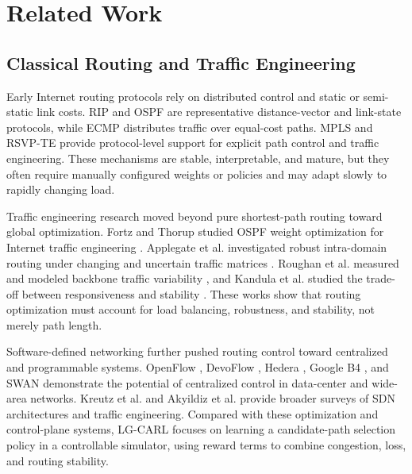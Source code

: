 \documentclass[9pt,a4paper,twocolumn,twoside]{rho-class/rho}
\begin{document}
\section{Related Work}

\subsection{Classical Routing and Traffic Engineering}

Early Internet routing protocols rely on distributed control and static or semi-static link costs. RIP \cite{hedrick1988rip} and OSPF \cite{moy1998ospf} are representative distance-vector and link-state protocols, while ECMP \cite{hopps2000ecmp} distributes traffic over equal-cost paths. MPLS \cite{rosen2001mpls} and RSVP-TE \cite{awduche2001rsvp} provide protocol-level support for explicit path control and traffic engineering. These mechanisms are stable, interpretable, and mature, but they often require manually configured weights or policies and may adapt slowly to rapidly changing load.

Traffic engineering research moved beyond pure shortest-path routing toward global optimization. Fortz and Thorup studied OSPF weight optimization for Internet traffic engineering \cite{fortz2000internet,fortz2002traffic}. Applegate et al. investigated robust intra-domain routing under changing and uncertain traffic matrices \cite{appelgate2003making}. Roughan et al. measured and modeled backbone traffic variability \cite{roughan2002experience}, and Kandula et al. studied the trade-off between responsiveness and stability \cite{kandula2005walking}. These works show that routing optimization must account for load balancing, robustness, and stability, not merely path length.

Software-defined networking further pushed routing control toward centralized and programmable systems. OpenFlow \cite{mckeown2008openflow}, DevoFlow \cite{curtis2011devoflow}, Hedera \cite{alfares2010hedera}, Google B4 \cite{jain2013b4}, and SWAN \cite{hong2013swan} demonstrate the potential of centralized control in data-center and wide-area networks. Kreutz et al. \cite{kreutz2015sdn} and Akyildiz et al. \cite{akyildiz2014roadmap} provide broader surveys of SDN architectures and traffic engineering. Compared with these optimization and control-plane systems, LG-CARL focuses on learning a candidate-path selection policy in a controllable simulator, using reward terms to combine congestion, loss, and routing stability.
\end{document}
